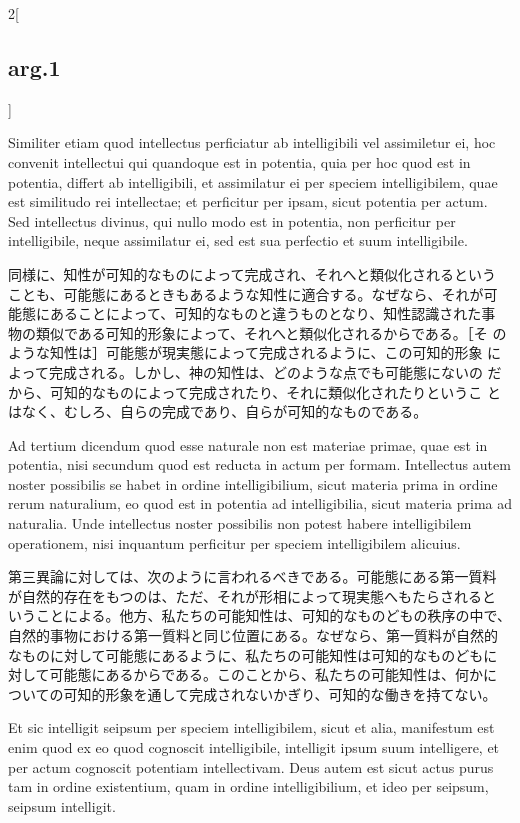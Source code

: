 \documentclass[paper=a4paper,fontsize=10pt,jafontsize=9pt,titlepage]{jlreq}
\begin{document}
\begin{paracol}{2}[\subsection{arg.1}]
\switchcolumn*

Similiter etiam quod intellectus perficiatur ab intelligibili vel
assimiletur ei, hoc convenit intellectui qui quandoque est in
potentia, quia per hoc quod est in potentia, differt ab intelligibili,
et assimilatur ei per speciem intelligibilem, quae est similitudo rei
intellectae; et perficitur per ipsam, sicut potentia per actum. Sed
intellectus divinus, qui nullo modo est in potentia, non perficitur
per intelligibile, neque assimilatur ei, sed est sua perfectio et suum
intelligibile.

\switchcolumn

同様に、知性が可知的なものによって完成され、それへと類似化されるという
ことも、可能態にあるときもあるような知性に適合する。なぜなら、それが可
能態にあることによって、可知的なものと違うものとなり、知性認識された事
物の類似である可知的形象によって、それへと類似化されるからである。［そ
のような知性は］可能態が現実態によって完成されるように、この可知的形象
によって完成される。しかし、神の知性は、どのような点でも可能態にないの
だから、可知的なものによって完成されたり、それに類似化されたりというこ
とはなく、むしろ、自らの完成であり、自らが可知的なものである。

\switchcolumn*

Ad tertium dicendum quod esse naturale non est materiae primae, quae
est in potentia, nisi secundum quod est reducta in actum per
formam. Intellectus autem noster possibilis se habet in ordine
intelligibilium, sicut materia prima in ordine rerum naturalium, eo
quod est in potentia ad intelligibilia, sicut materia prima ad
naturalia. Unde intellectus noster possibilis non potest habere
intelligibilem operationem, nisi inquantum perficitur per speciem
intelligibilem alicuius.

\switchcolumn

第三異論に対しては、次のように言われるべきである。可能態にある第一質料
が自然的存在をもつのは、ただ、それが形相によって現実態へもたらされると
いうことによる。他方、私たちの可能知性は、可知的なものどもの秩序の中で、
自然的事物における第一質料と同じ位置にある。なぜなら、第一質料が自然的
なものに対して可能態にあるように、私たちの可能知性は可知的なものどもに
対して可能態にあるからである。このことから、私たちの可能知性は、何かに
ついての可知的形象を通して完成されないかぎり、可知的な働きを持てない。

\switchcolumn*

Et sic intelligit seipsum per speciem intelligibilem, sicut et alia,
manifestum est enim quod ex eo quod cognoscit intelligibile,
intelligit ipsum suum intelligere, et per actum cognoscit potentiam
intellectivam. Deus autem est sicut actus purus tam in ordine
existentium, quam in ordine intelligibilium, et ideo per seipsum,
seipsum intelligit.


\end{paracol}
\end{document}
